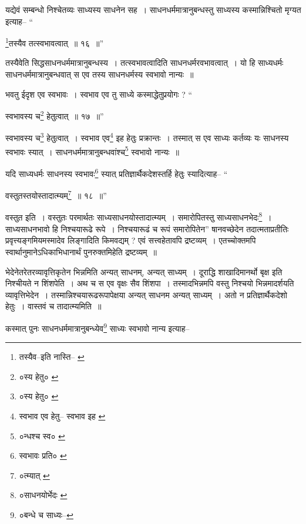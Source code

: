 \documentclass[article,12pt,a4paper]{memoir}
\begin{document}
	यद्येवं सम्बन्धो निश्चेतव्यः साध्यस्य साधनेन सह । साधनधर्ममात्रानुबन्धस्तु साध्यस्य कस्मान्निश्चितो मृग्यत इत्याह-- “
	  
	\footnote{तस्यैव--इति नास्ति--\cite{dp-edP} \cite{dp-edH}}तस्यैव तत्स्वभावत्वात् ॥ १६ ॥” 
	  
	तस्यैवेति सिद्धसाधनधर्ममात्रानुबन्धस्य । तत्स्वभावत्वादिति साधनधर्मरवभावत्वात् । यो हि साध्यधर्मः साधनधर्ममात्रानुबन्धवात् स एव तस्य साधनधर्मस्य स्वभावो नान्यः ॥ 
	  
	भवतु ईदृश एव स्वभावः । स्वभाव एव तु साध्ये कस्माद्धेतुप्रयोगः ? “
	  
	स्वभावस्य च\footnote{०स्य हेतु० \cite{dp-msC}} हेतुत्वात् ॥ १७ ॥” 
	  
	स्वभावस्य च\footnote{०स्य हेतु० \cite{dp-msC}} हेतुत्वात् । स्वभाव एव\footnote{स्वभाव एव हेतु--\cite{dp-msB} स्वभाव इह \cite{dp-msA} \cite{dp-edP} \cite{dp-edH} \cite{dp-edN}} इह हेतुः प्रक्रान्तः । तस्मात् स एव साध्यः कर्तव्यः यः साधनस्य स्वभावः स्यात् । साधनधर्ममात्रानुबन्धवांश्च\footnote{०न्धश्च स्व० \cite{dp-msA} \cite{dp-edP} \cite{dp-edE} \cite{dp-edH} \cite{dp-edN}} स्वभावो नान्यः ॥ 
	  
	यदि साध्यधर्मः साधनस्य स्वभावः\footnote{स्वभावः प्रति० \cite{dp-msA} \cite{dp-msB} \cite{dp-msD} \cite{dp-edP} \cite{dp-edE} \cite{dp-edH} \cite{dp-edN}} स्यात् प्रतिज्ञार्थैकदेशस्तर्हि हेतुः स्यादित्याह-- “
	  
	वस्तुतस्तयोस्तादात्म्यम्\footnote{०त्म्यात् \cite{dp-msB} \cite{dp-msD} \cite{dp-edP} \cite{dp-edH} \cite{dp-edE} \cite{dp-edN}} ॥ १८ ॥” 
	  
	वस्तुत इति । वस्तुतः परमार्थतः साध्यसाधनयोस्तादात्म्यम् । समारोपितस्तु साध्यसाधनभेदः\footnote{०साधनयोर्भेदः \cite{dp-msA} \cite{dp-edP} \cite{dp-edH} \cite{dp-edE} \cite{dp-edN}} । साध्यसाधनभावो हि निश्चयारूढे रूपे । निश्चयारूढं च रूपं समारोपितेन” षानवच्छेदेन तदात्मताप्रतीतिः प्रवृत्त्यङ्गमियमस्मादेव लिङ्गादिति किमवद्यम् ? एवं सत्त्वहेतावपि द्रष्टव्यम् । एतच्चोक्तमपि स्वार्थानुमानेऽधिकाभिधानार्थं पुनरुक्तमिहेति द्रष्टव्यम् ॥
	\pend
      \leavevmode{}
	  \bigskip
	  \begingroup
	

	  \pstart भेदेनेतरेतरव्यावृत्तिकृतेन भिन्नमिति अन्यत् साधनम्, अन्यत् साध्यम् । दूराद्धि शाखादिमानर्थो बृक्ष इति निश्चीयते न शिंशपेति । अथ च स एव वृक्षः सैव शिंशपा । तस्मादभिन्नमपि वस्तु निश्चयो भिन्नमादर्शयति व्यावृत्तिभेदेन । तस्मान्निश्चयारूढरूपापेक्षया अन्यत् साधनम अन्यत् साध्यम् । अतो न प्रतिज्ञार्थैकदेशो हेतुः । वास्तवं च तादात्म्यमिति ॥
	\pend
       

	  \pstart कस्मात् पुनः साधनधर्ममात्रानुबन्ध्येव\footnote{०बन्धे च साध्यः--\cite{dp-msB}} साध्यः स्वभावो नान्य इत्याह--
	\pend
       
\end{document}
